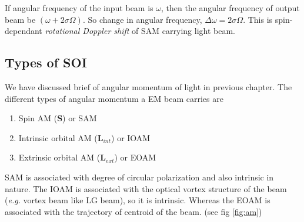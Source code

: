 \documentclass[11pt,a4paper]{article}
\numberwithin{equation}{section}
\begin{document}
If angular frequency of the input beam is $\omega$, then the angular frequency of output beam be $(\omega + 2\sigma\Omega)$. So change in angular frequency, $\Delta\omega=2\sigma\Omega$. This is spin-dependant \textit{rotational Doppler shift} of SAM carrying light beam. \cite{WO}


\subsection{Types of SOI}
We have discussed brief of angular momentum of light in previous chapter. The different types of angular momentum a EM beam carries are
\begin{enumerate}
	\item Spin AM ($\boldsymbol{S}$) or SAM
	\item Intrinsic orbital AM ($\boldsymbol{L}_{int}$) or IOAM
	\item Extrinsic orbital AM ($\boldsymbol{L}_{ext}$) or EOAM
\end{enumerate}
SAM is associated with degree of circular polarization and also intrinsic in nature. The IOAM is associated with the optical vortex structure of the beam (\textit{e.g.} vortex beam like LG beam), so it is intrinsic. Whereas the EOAM is associated with the trajectory of centroid of the beam. \cite{bliokh 12} (see fig \ref{fig:am}) 
\end{document}
